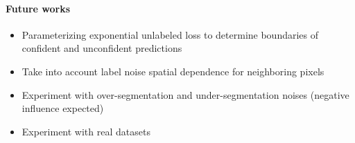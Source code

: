 \paragraph{Future works}

\begin{itemize}
  \item Parameterizing exponential unlabeled loss to determine boundaries of confident and unconfident predictions
  \item Take into account label noise spatial dependence for neighboring pixels
  \item Experiment with over-segmentation and under-segmentation noises (negative influence expected)
  \item Experiment with real datasets
\end{itemize}
